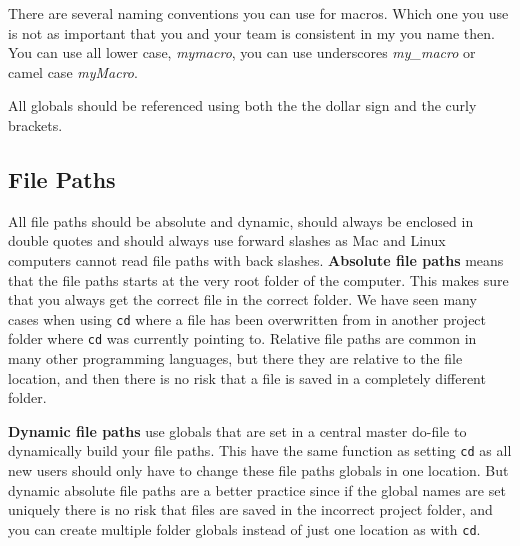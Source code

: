 There are several naming conventions you can use for macros. Which one you use is not as important that you 
and your team is consistent in my you name then. You can use all lower case, \textit{mymacro}, you can use 
underscores \textit{my\_macro} or camel case \textit{myMacro}.

All globals should be referenced using both the the dollar sign and the curly brackets.


\subsection{File Paths}

All file paths should be absolute and dynamic, should always be enclosed in double quotes and should
always use forward slashes as Mac and Linux computers cannot read file paths with back slashes.
\textbf{Absolute file paths} means that the file paths starts at the very root folder of the computer. This makes sure that
you always get the correct file in the correct folder. We have seen many cases when using \verb|cd| where
a file has been overwritten from in another project folder where \verb|cd| was currently pointing to.
Relative file paths are common in many other programming languages, but there they are relative to the
file location, and then there is no risk that a file is saved in a completely different folder.

\textbf{Dynamic file paths} use globals that are set in a central master do-file to dynamically build your file
paths. This have the same function as setting \verb|cd| as all new users should only have to change these
file paths globals in one location. But dynamic absolute file paths are a better practice since if the
global names are set uniquely there is no risk that files are saved in the incorrect project folder, and
you can create multiple folder globals instead of just one location as with \verb|cd|.


\mainmatter
